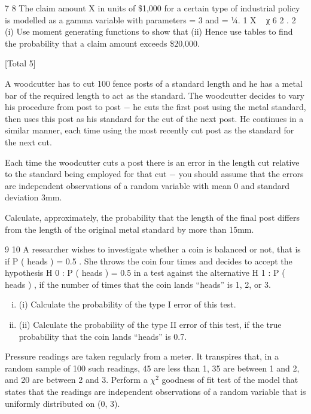 \documentclass[a4paper,12pt]{article}
\begin{document}
\begin{enumerate}
7
8
The claim amount X in units of \$1,000 for a certain type of industrial policy is modelled as a gamma variable with parameters \alpha = 3 and \lambda = 1⁄4.
1
X ~ χ 6 2 .
2
(i) Use moment generating functions to show that
(ii) Hence use tables to find the probability that a claim amount exceeds \$20,000.

[Total 5]

A woodcutter has to cut 100 fence posts of a standard length and he has a metal bar of the required length to act as the standard. The woodcutter decides to vary his procedure from post to post − he cuts the first post using the metal standard, then uses
this post as his standard for the cut of the next post. He continues in a similar manner, each time using the most recently cut post as the standard for the next cut.

Each time the woodcutter cuts a post there is an error in the length cut relative to the
standard being employed for that cut − you should assume that the errors are independent observations of a random variable with mean 0 and standard deviation 3mm.

Calculate, approximately, the probability that the length of the final post differs from the length of the original metal standard by more than 15mm.

9
10
A researcher wishes to investigate whether a coin is balanced or not, that is if P ( heads ) = 0.5 . She throws the coin four times and decides to accept the hypothesis H 0 : P ( heads ) = 0.5 in a test against the alternative H 1 : P ( heads )  , if the number
of times that the coin lands “heads” is 1, 2, or 3.
\begin{enumerate}[(i)]
\item (i) Calculate the probability of the type I error of this test.

\item (ii) Calculate the probability of the type II error of this test, if the true probability
that the coin lands “heads” is 0.7.

\end{enumerate}
Pressure readings are taken regularly from a meter. It transpires that, in a random
sample of 100 such readings, 45 are less than 1, 35 are between 1 and 2, and 20 are
between 2 and 3.
Perform a $\chi^2$ goodness of fit test of the model that states that the readings are
independent observations of a random variable that is uniformly distributed on (0, 3).


\end{enumerate}
\end{document}
